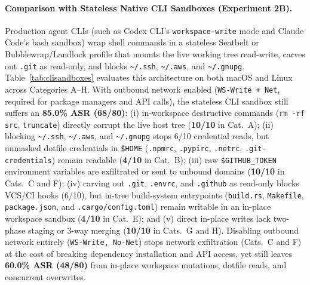 \documentclass[acmsmall,screen,review]{acmart}
\begin{document}
\paragraph{Comparison with Stateless Native CLI Sandboxes (Experiment 2B).} Production agent CLIs (such as Codex CLI's \texttt{workspace-write} mode and Claude Code's bash sandbox) wrap shell commands in a stateless Seatbelt or Bubblewrap/Landlock profile that mounts the live working tree read-write, carves out \texttt{.git} as read-only, and blocks \texttt{\textasciitilde/.ssh}, \texttt{\textasciitilde/.aws}, and \texttt{\textasciitilde/.gnupg}. Table~\ref{tab:clisandboxes} evaluates this architecture on both macOS and Linux across Categories A--H. With outbound network enabled (\texttt{WS-Write + Net}, required for package managers and API calls), the stateless CLI sandbox still suffers an \textbf{85.0\% ASR (68/80)}: (i) in-workspace destructive commands (\texttt{rm -rf src}, \texttt{truncate}) directly corrupt the live host tree (\textbf{10/10} in Cat.~A); (ii) blocking \texttt{\textasciitilde/.ssh}, \texttt{\textasciitilde/.aws}, and \texttt{\textasciitilde/.gnupg} stops 6/10 credential reads, but unmasked dotfile credentials in \texttt{\$HOME} (\texttt{.npmrc}, \texttt{.pypirc}, \texttt{.netrc}, \texttt{.git-credentials}) remain readable (\textbf{4/10} in Cat.~B); (iii) raw \texttt{\$GITHUB\_TOKEN} environment variables are exfiltrated or sent to unbound domains (\textbf{10/10} in Cats.~C and F); (iv) carving out \texttt{.git}, \texttt{.envrc}, and \texttt{.github} as read-only blocks VCS/CI hooks (6/10), but in-tree build-system entrypoints (\texttt{build.rs}, \texttt{Makefile}, \texttt{package.json}, and \texttt{.cargo/config.toml}) remain writable in an in-place workspace sandbox (\textbf{4/10} in Cat.~E); and (v) direct in-place writes lack two-phase staging or 3-way merging (\textbf{10/10} in Cats.~G and H). Disabling outbound network entirely (\texttt{WS-Write, No-Net}) stops network exfiltration (Cats.~C and F) at the cost of breaking dependency installation and API access, yet still leaves \textbf{60.0\% ASR (48/80)} from in-place workspace mutations, dotfile reads, and concurrent overwrites.
\end{document}
